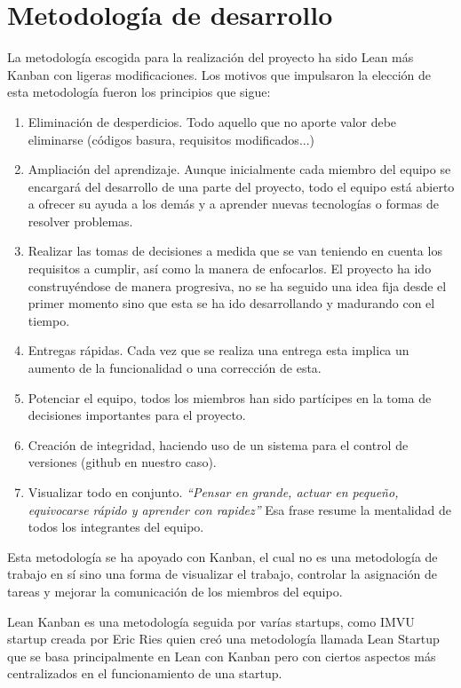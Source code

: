 \section{Metodología de desarrollo}
La metodología escogida para la realización del proyecto ha sido Lean más Kanban con ligeras modificaciones. Los motivos que impulsaron la elección de esta metodología fueron los principios que sigue:

\begin{enumerate}
\item Eliminación de desperdicios. Todo aquello que no aporte valor debe eliminarse (códigos basura, requisitos modificados...)
\item Ampliación del aprendizaje. Aunque inicialmente cada miembro del equipo se encargará del desarrollo de una parte del proyecto, todo el equipo está abierto a ofrecer su ayuda a los demás y a aprender nuevas tecnologías o formas de resolver problemas.
\item Realizar las tomas de decisiones a medida que se van teniendo en cuenta los requisitos a cumplir, así como la manera de enfocarlos. El proyecto ha ido construyéndose de manera progresiva, no se ha seguido una idea fija desde el primer momento sino que esta se ha ido desarrollando y madurando con el tiempo.
\item Entregas rápidas. Cada vez que se realiza una entrega esta implica un aumento de la funcionalidad o una corrección de esta.
\item Potenciar el equipo, todos los miembros han sido partícipes en la toma de decisiones importantes para el proyecto.
\item Creación de integridad, haciendo uso de un sistema para el control de versiones (github en nuestro caso).
\item Visualizar todo en conjunto. \textit{“Pensar en grande, actuar en pequeño, equivocarse rápido y aprender con rapidez”} Esa frase resume la mentalidad de todos los integrantes del equipo. \newline
\end{enumerate}
Esta metodología se ha apoyado con Kanban, el cual no es una metodología de trabajo en sí sino una forma de visualizar el trabajo, controlar la asignación de tareas y mejorar la comunicación de los miembros del equipo.

Lean Kanban es una metodología seguida por varías startups, como IMVU startup creada por Eric Ries quien creó una metodología llamada Lean Startup que se basa principalmente en Lean con Kanban pero con ciertos aspectos más centralizados en el funcionamiento de una startup.

